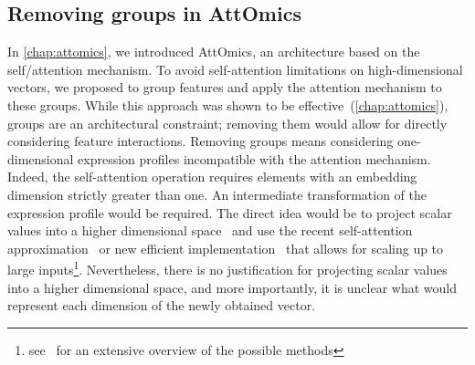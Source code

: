 \documentclass[../main.tex]{subfiles}
\begin{document}
	\subsection{Removing groups in AttOmics}\label{sec:scalar_attention}
		In \cref{chap:attomics}, we introduced AttOmics, an architecture based on the self\-/attention mechanism.
		To avoid self-attention limitations on high-dimensional vectors, we proposed to group features and apply the attention mechanism to these groups.
		While this approach was shown to be effective~(\cref{chap:attomics}), groups are an architectural constraint; removing them would allow for directly considering feature interactions.
		Removing groups means considering one-dimensional expression profiles incompatible with the attention mechanism.
		Indeed, the self-attention operation requires elements with an embedding dimension strictly greater than one.
		An intermediate transformation of the expression profile would be required.
		The direct idea would be to project scalar values into a higher dimensional space~\cite{gorishniy2021revisiting} and use the recent self-attention approximation~\cite{xiongNystrOmformerNystr2021,Linformer} or new efficient implementation~\cite{FlashAttention,rabeSelfattentionDoesNot2021,bolyaHydraAttentionEfficient2022a} that allows for scaling up to large inputs\footnote{see~\cite{EfficientTransformers} for an extensive overview of the possible methods}.
		Nevertheless, there is no justification for projecting scalar values into a higher dimensional space, and more importantly, it is unclear what would represent each dimension of the newly obtained vector.
\end{document}
